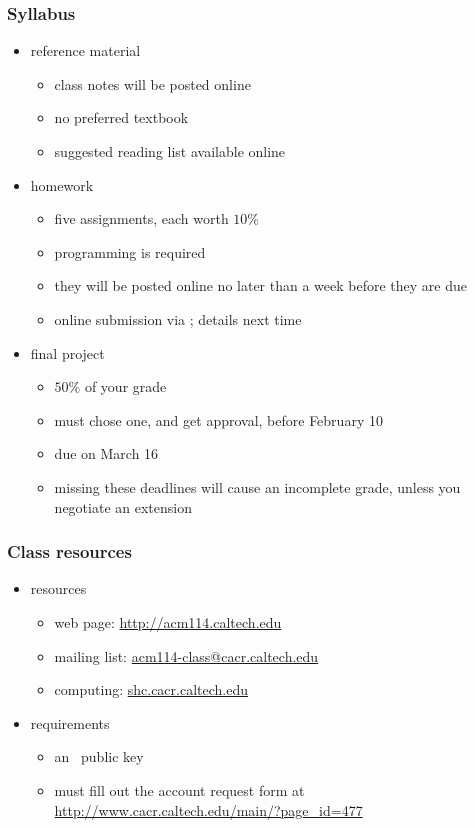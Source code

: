 \begin{frame}[fragile]
%
  \frametitle{Syllabus}
%
%
  \begin{itemize}
%
  \item reference material
    \begin{itemize}
    \item class notes will be posted online
    \item no preferred textbook
    \item suggested reading list available online
    \end{itemize}
%
  \item homework
    \begin{itemize}
    \item five assignments, each worth $10\%$ 
    \item programming is required
    \item they will be posted online no later than a week before they are due
    \item online submission via \bzr; details next time
    \end{itemize}
%
  \item final project
    \begin{itemize}
    \item $50\%$ of your grade
    \item must chose one, and get approval, before February 10
    \item due on March 16
    \item missing these deadlines will cause an incomplete grade, unless you negotiate an
      extension
    \end{itemize}
%
  \end{itemize}
%
\end{frame}

\begin{frame}[fragile]
%
  \frametitle{Class resources}
%
%
  \begin{itemize}
%
  \item resources
    \begin{itemize}
    \item web page: \url{http://acm114.caltech.edu}
    \item mailing list: \url{acm114-class@cacr.caltech.edu}
    \item computing: \url{shc.cacr.caltech.edu}
    \end{itemize}
%
  \item requirements
    \begin{itemize}
    \item an \ssh\ public key
    \item must fill out the account request form at
      \url{http://www.cacr.caltech.edu/main/?page_id=477}
    \end{itemize}
      
%
  \end{itemize}
%
\end{frame}

